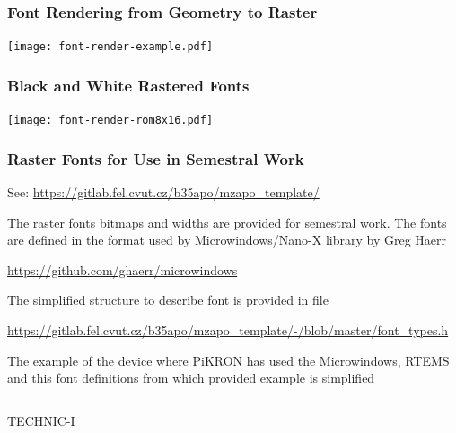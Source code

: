 \documentclass{beamer}
\begin{document}
\begin{frame}
\frametitle{Font Rendering from Geometry to Raster}

\texttt{[image: font-render-example.pdf]}

\end{frame}


\begin{frame}
\frametitle{Black and White Rastered Fonts}

\texttt{[image: font-render-rom8x16.pdf]}

\end{frame}

\begin{frame}
\frametitle{Raster Fonts for Use in Semestral Work}

{\small
See: \url{https://gitlab.fel.cvut.cz/b35apo/mzapo_template/}

}

{\small
The raster fonts bitmaps and widths are provided for semestral work. The
fonts are defined in the format used by Microwindows/Nano-X library by
Greg Haerr

\url{https://github.com/ghaerr/microwindows}

}

{\small
The simplified structure to describe font is provided in file

}

{\tiny
\url{https://gitlab.fel.cvut.cz/b35apo/mzapo_template/-/blob/master/font_types.h}

}

{\small
The example of the device where PiKRON has used the Microwindows, RTEMS
and this font definitions from which provided example is simplified

}

\begin{columns}
\begin{column}{0.45\textwidth}
  \begin{center}
     TECHNIC-I


\end{center}
\end{column}
\end{columns}
\end{frame}
\end{document}
